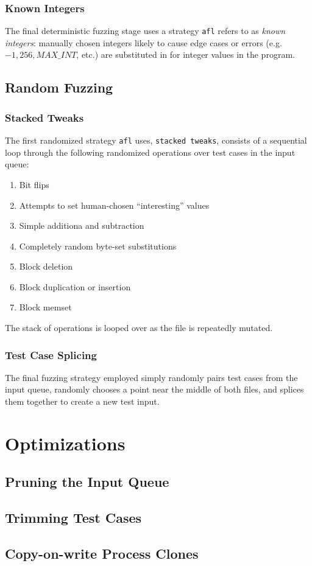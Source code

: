 \subsubsection{Known Integers}

The final deterministic fuzzing stage uses a strategy \texttt{afl} refers
to as \textit{known integers}: manually chosen integers likely to cause
edge cases or errors (e.g. $-1, 256, MAX\_INT$, etc.) are substituted
in for integer values in the program.

\subsection{Random Fuzzing}

\subsubsection{Stacked Tweaks}

The first randomized strategy \texttt{afl} uses, \texttt{stacked tweaks},
consists of a sequential loop through the following randomized operations
over test cases in the input queue:

\begin{enumerate}
	\item Bit flips
	\item Attempts to set human-chosen ``interesting'' values
    \item Simple additiona and subtraction
    \item Completely random byte-set substitutions
    \item Block deletion
    \item Block duplication or insertion
    \item Block memset
\end{enumerate}

The stack of operations is looped over as the file is repeatedly mutated.

\subsubsection{Test Case Splicing}

The final fuzzing strategy employed simply randomly pairs test cases from
the input queue, randomly chooses a point near the middle of both files,
and splices them together to create a new test input.

\section{Optimizations}

\subsection{Pruning the Input Queue}

\subsection{Trimming Test Cases}

\subsection{Copy-on-write Process Clones}
